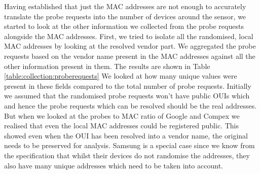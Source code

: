 Having established that just the MAC addresses are not enough to accurately translate the probe requests into the number of devices around the sensor, we started to look at the other information we collected from the probe requests alongside the MAC addresses.
First, we tried to isolate all the randomised, local MAC addresses by looking at the resolved vendor part.
We aggregated the probe requests based on the vendor name present in the MAC addresses against all the other information present in them.
The results are shown in Table \ref{table:collection:proberequests}
We looked at how many unique values were present in these fields compared to the total number of probe requests. 
Initially we assumed that the randomised probe requests won't have public OUIs which and hence the probe requests which can be resolved should be the real addresses.
But when we looked at the probes to MAC ratio of Google and Compex we realised that even the local MAC addresses could be registered public. 
This showed even when the OUI has been resolved into a vendor name, the original needs to be preserved for analysis.
Samsung is a special case since we know from the specification that whilst their devices do not randomise the addresses, they also have many unique addresses which need to be taken into account.

